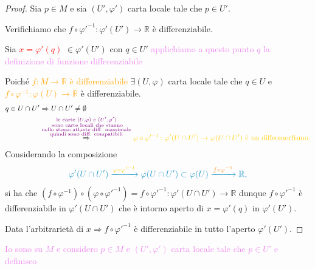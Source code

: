         \begin{proof}
        \mbox{}
        
        Sia $p \in M$ e sia $(U', \varphi')$ carta locale tale che $p \in U'$. 
        
        Verifichiamo che $f \circ \varphi'^{-1} \colon \varphi'(U') \to \mathbb{R}$ è differenziabile.

        Sia \textcolor{red}{$x = \varphi'(q)$} $\in \varphi'(U')$ con $q \in U'$ \textcolor{violet}{applichiamo a questo punto $q$ la definizione di funzione differenziabile} 
        
        Poiché \textcolor{orange}{$f \colon M \to \mathbb{R}$ è differenziabile} $\exists (U, \varphi)$ carta locale tale che $q \in U$ e
        \textcolor{orange}{$f \circ \varphi^{-1} \colon \varphi(U) \to \mathbb{R}$} è differenziabile.
        \begin{align*}
        q \in U \cap U' &\Rightarrow U \cap U' \ne \emptyset \\
        &\overset{\textcolor{violet}{\substack{\text{le carte } (U, \varphi) \text{ e }  (U', \varphi') \\  \text{ sono carte locali che stanno} \\ \text{nello stesso atlante diff. massimale} \\
        \text{quindi sono diff. compatibili} }}}{\Rightarrow} \textcolor{amber}{\varphi \circ \varphi'^{-1} \colon \varphi'(U \cap U') \to \varphi(U \cap U') \text{ è un diffeomorfismo.}}
        \end{align*}
        Considerando la composizione
        \[
        \color{celeste} \varphi'(U \cap U') \xrightarrow{\textcolor{amber}{\varphi \circ \varphi'^{-1}}} \varphi(U \cap U') \subset \varphi(U) \xrightarrow{\textcolor{orange}{f \circ \varphi^{-1}}} \mathbb{R},
        \]
        si ha che \textcolor{celeste}{$(f \circ \varphi^{-1}) \circ (\varphi \circ \varphi'^{-1}) = f \circ \varphi'^{-1} \colon \varphi'(U \cap U') \to \mathbb{R}$} dunque
         $f \circ \varphi'^{-1}$ è differenziabile in $\varphi'(U \cap U')$ che è intorno aperto di $x = \varphi'(q)$ in $\varphi'(U')$. 
        
        Data l'arbitrarietà di $x \Rightarrow f \circ \varphi'^{-1}$ è differenziabile in tutto l'aperto $\varphi'(U')$.
        \end{proof}
        \textcolor{violet}{Io sono su \textcolor{blu}{$M$} e considero $p \in M$ e $(U', \varphi')$ carta locale tale che $p \in U'$ e definisco}
        
